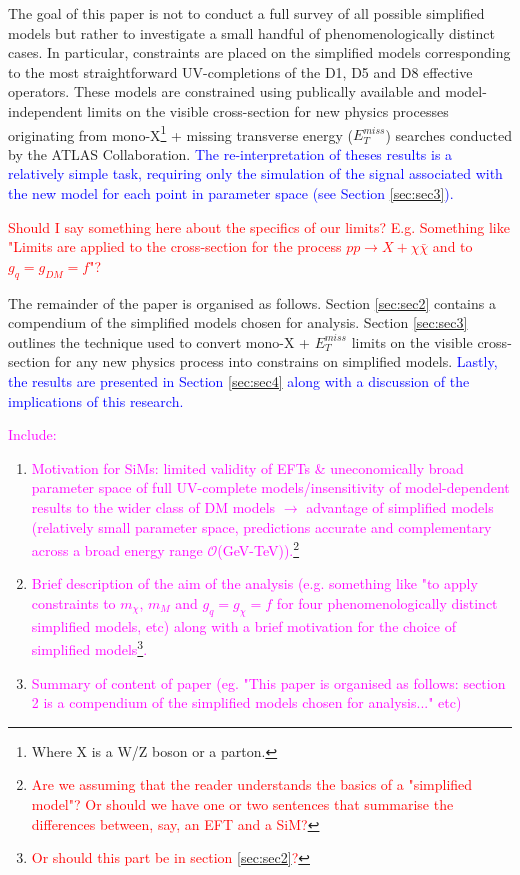 \begin{flushleft}
\hspace{1cm}The goal of this paper is not to conduct a full survey of all possible simplified models but rather to investigate a small handful of phenomenologically distinct cases. In particular, constraints are placed on the simplified models corresponding to the most straightforward UV-completions of the D1, D5 and D8 effective operators. %
These models are constrained using publically available and model-independent limits on the visible cross-section for new physics processes originating from mono-X\footnote{Where X is a W/Z boson or a parton.} + missing transverse energy ($E_{T}^{miss}$) searches conducted by the ATLAS Collaboration.  \textcolor{blue}{The re-interpretation of theses results is a relatively simple task, requiring only the simulation of the signal associated with the new model for each point in parameter space (see Section \ref{sec:sec3}).}

\hspace{1cm}\textcolor{red}{Should I say something here about the specifics of our limits? E.g. Something like "Limits are applied to the cross-section for the process $pp \rightarrow X + \chi\bar{\chi}$ and to $g_{q} = g_{DM} = f$"?}

\hspace{1cm}The remainder of the paper is organised as follows. Section \ref{sec:sec2} contains a compendium of the simplified models chosen for analysis. Section \ref{sec:sec3} outlines the technique used to convert mono-X + $E_{T}^{miss}$ limits on the visible cross-section for any new physics process into constrains on simplified models. \textcolor{blue}{Lastly, the results are presented in Section \ref{sec:sec4} along with a discussion of the implications of this research.}
\bigskip

\textcolor{magenta}{Include:}
\begin{enumerate}
\item \textcolor{magenta}{Motivation for SiMs: limited validity of EFTs \& uneconomically broad parameter space of full UV-complete models/insensitivity of model-dependent results to the wider class of DM models $\rightarrow$ advantage of simplified models (relatively small parameter space, predictions accurate and complementary across a broad energy range $\mathcal{O}$(GeV-TeV)).\footnote{\textcolor{red}{Are we assuming that the reader understands the basics of a "simplified model"? Or should we have one or two sentences that summarise the differences between, say, an EFT and a SiM?}}}
\item \textcolor{magenta}{Brief description of the aim of the analysis (e.g. something like "to apply constraints to $m_{\chi}$, $m_{M}$ and $g_{q} = g_{\chi} = f$ for four phenomenologically distinct simplified models, etc) along with a brief motivation for the choice of simplified models\footnote{\textcolor{red}{Or should this part be in section \ref{sec:sec2}?}}.}
\item \textcolor{magenta}{Summary of content of paper (eg. "This paper is organised as follows: section 2 is a compendium of the simplified models chosen for analysis..." etc)}
\end{enumerate}
\end{flushleft}